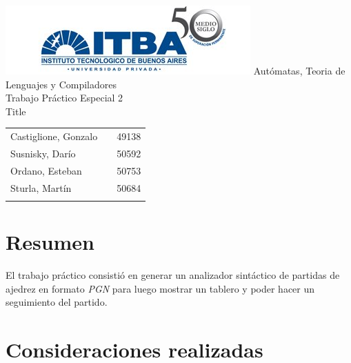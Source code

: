 \documentclass[a4paper,10pt]{article}
\begin{document}
\begin{titlepage}
	\thispagestyle{empty}
	\begin{center}
		\includegraphics[scale=0.7]{./images/itba.jpg}
		\vfill
		\Huge{Autómatas, Teoria de Lenguajes y Compiladores}\\
		\vspace{1cm}
		\huge{Trabajo Práctico Especial 2} \\
		\vspace{0.3cm}
		\huge{Title}
	\end{center}
	\vspace{2cm}
	\large{
		\begin{tabular}{lcr}
			Castiglione, Gonzalo & & 49138 \\
			Susnisky, Darío & & 50592 \\
			Ordano, Esteban & & 50753 \\
			Sturla, Martín & & 50684 \\
			\\ 
		\end{tabular}
	}
	\vfill
	\flushright{\today}
\end{titlepage}

\newpage


	\thispagestyle{empty}
\tableofcontents

\newpage

\setcounter{page}{1}

\newpage

\section{Resumen}
El trabajo práctico consistió en generar un analizador sintáctico de partidas de ajedrez en formato \textit{PGN} 
para luego mostrar un tablero y poder hacer un seguimiento del partido.
\newpage

\section{Consideraciones realizadas}
\end{document}
